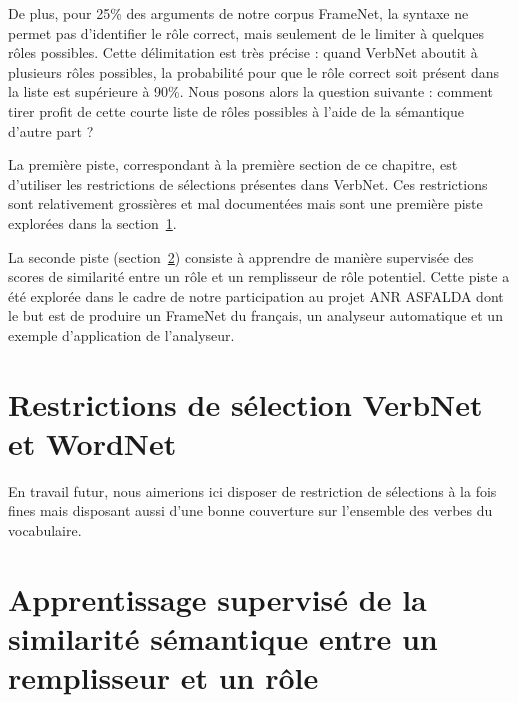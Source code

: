 De plus, pour 25\% des arguments de notre corpus FrameNet, la syntaxe ne permet
pas d'identifier le rôle correct, mais seulement de le limiter à quelques rôles
possibles. Cette délimitation est très précise : quand VerbNet aboutit à
plusieurs rôles possibles, la probabilité pour que le rôle correct soit présent
dans la liste est supérieure à 90\%. Nous posons alors la question suivante :
comment tirer profit de cette courte liste de rôles possibles à l'aide de la
sémantique d'autre part ?

La première piste, correspondant à la première section de ce chapitre, est
d'utiliser les restrictions de sélections présentes dans VerbNet. Ces
restrictions sont relativement grossières et mal documentées mais sont une
première piste explorées dans la section~\ref{sec:restr_verbnet}.

La seconde piste (section~\ref{sec:similarity_module}) consiste à apprendre de
manière supervisée des scores de similarité entre un rôle et un remplisseur de
rôle potentiel. Cette piste a été explorée dans le cadre de notre participation
au projet ANR ASFALDA dont le but est de produire un FrameNet du français, un
analyseur automatique et un exemple d'application de l'analyseur.

\section{Restrictions de sélection VerbNet et WordNet}
\label{sec:restr_verbnet}

En travail futur, nous aimerions ici disposer de restriction de sélections à la
fois fines mais disposant aussi d'une bonne couverture sur l'ensemble des
verbes du vocabulaire.

\section{Apprentissage supervisé de la similarité sémantique entre un remplisseur et un rôle}
\label{sec:similarity_module}

